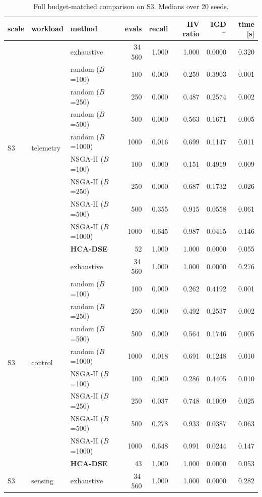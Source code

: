 \documentclass[preprint,11pt,3p]{elsarticle}
\begin{document}
\begin{table}[!htbp]\centering
\caption{Full budget-matched comparison on S3. Medians over 20 seeds.}
\scriptsize
\begin{tabular}{lllrrrrr}
\toprule
scale & workload & method & evals & recall & HV ratio & IGD$^{+}$ & time [s] \\
\midrule
\multirow{10}{*}{S3} & \multirow{10}{*}{telemetry} & exhaustive & 34\,560 & 1.000 & 1.000 & 0.0000 & 0.320 \\
 & & random ($B$=100) & 100 & 0.000 & 0.259 & 0.3903 & 0.001 \\
 & & random ($B$=250) & 250 & 0.000 & 0.487 & 0.2574 & 0.002 \\
 & & random ($B$=500) & 500 & 0.000 & 0.563 & 0.1671 & 0.005 \\
 & & random ($B$=1000) & 1000 & 0.016 & 0.699 & 0.1147 & 0.011 \\
 & & NSGA-II ($B$=100) & 100 & 0.000 & 0.151 & 0.4919 & 0.009 \\
 & & NSGA-II ($B$=250) & 250 & 0.000 & 0.687 & 0.1732 & 0.026 \\
 & & NSGA-II ($B$=500) & 500 & 0.355 & 0.915 & 0.0558 & 0.061 \\
 & & NSGA-II ($B$=1000) & 1000 & 0.645 & 0.987 & 0.0415 & 0.146 \\
 & & \textbf{HCA-DSE} & 52 & 1.000 & 1.000 & 0.0000 & 0.055 \\
\midrule
\multirow{10}{*}{S3} & \multirow{10}{*}{control} & exhaustive & 34\,560 & 1.000 & 1.000 & 0.0000 & 0.276 \\
 & & random ($B$=100) & 100 & 0.000 & 0.262 & 0.4192 & 0.001 \\
 & & random ($B$=250) & 250 & 0.000 & 0.492 & 0.2537 & 0.002 \\
 & & random ($B$=500) & 500 & 0.000 & 0.564 & 0.1746 & 0.005 \\
 & & random ($B$=1000) & 1000 & 0.018 & 0.691 & 0.1248 & 0.010 \\
 & & NSGA-II ($B$=100) & 100 & 0.000 & 0.286 & 0.4405 & 0.010 \\
 & & NSGA-II ($B$=250) & 250 & 0.037 & 0.748 & 0.1009 & 0.025 \\
 & & NSGA-II ($B$=500) & 500 & 0.278 & 0.933 & 0.0387 & 0.063 \\
 & & NSGA-II ($B$=1000) & 1000 & 0.648 & 0.991 & 0.0244 & 0.147 \\
 & & \textbf{HCA-DSE} & 43 & 1.000 & 1.000 & 0.0000 & 0.053 \\
\midrule
\multirow{10}{*}{S3} & \multirow{10}{*}{sensing} & exhaustive & 34\,560 & 1.000 & 1.000 & 0.0000 & 0.282 \\

\end{tabular}
\end{table}
\end{document}
